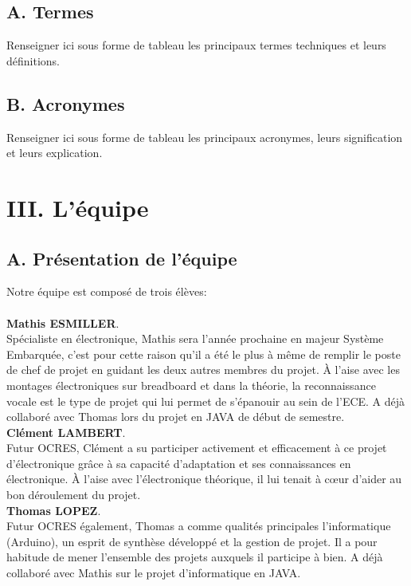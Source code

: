\documentclass[a4paper,11pt]{book}
\begin{document}
\subsection*{A. Termes}
Renseigner ici sous forme de tableau les principaux termes techniques et leurs définitions.

\subsection*{B. Acronymes}
Renseigner ici sous forme de tableau les principaux acronymes, leurs signification et leurs explication.

\newpage
\section*{III. L'équipe}
\subsection*{A. Présentation de l'équipe}
Notre équipe est composé de trois élèves:\\ \\

\textbf{Mathis ESMILLER}.\\
Spécialiste en électronique, Mathis sera l'année prochaine en majeur Système Embarquée, c'est pour cette raison qu'il a été le plus à même de remplir le poste de chef de projet en guidant les deux autres membres du projet. À l'aise avec les montages électroniques sur breadboard et dans la théorie, la reconnaissance vocale est le type de projet qui lui permet de s'épanouir au sein de l'ECE. A déjà collaboré avec Thomas lors du projet en JAVA de début de semestre. \\

\textbf{Clément LAMBERT}.\\
Futur OCRES, Clément a su participer activement et efficacement à ce projet d'électronique grâce à sa capacité d'adaptation et ses connaissances en électronique. À l'aise avec l'électronique théorique, il lui tenait à cœur d'aider au bon déroulement du projet. \\

\textbf{Thomas LOPEZ}.\\
Futur OCRES également, Thomas a comme qualités principales l'informatique (Arduino), un esprit de synthèse développé et la gestion de projet. Il a pour habitude de mener l'ensemble des projets auxquels il participe à bien. A déjà collaboré avec Mathis sur le projet d'informatique en JAVA. \\ 
\end{document}
